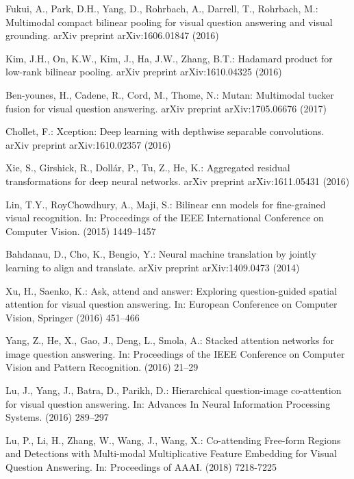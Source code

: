 \documentclass[runningheads]{llncs}
\begin{document}
\begin{thebibliography}{8}
Fukui, A., Park, D.H., Yang, D., Rohrbach, A., Darrell, T., Rohrbach, M.:
\newblock Multimodal compact bilinear pooling for visual question answering and
  visual grounding.
\newblock arXiv preprint arXiv:1606.01847 (2016)

Kim, J.H., On, K.W., Kim, J., Ha, J.W., Zhang, B.T.:
\newblock Hadamard product for low-rank bilinear pooling.
\newblock arXiv preprint arXiv:1610.04325 (2016)

Ben-younes, H., Cadene, R., Cord, M., Thome, N.:
\newblock Mutan: Multimodal tucker fusion for visual question answering.
\newblock arXiv preprint arXiv:1705.06676 (2017)

Chollet, F.:
\newblock Xception: Deep learning with depthwise separable convolutions.
\newblock arXiv preprint arXiv:1610.02357 (2016)

Xie, S., Girshick, R., Doll{\'a}r, P., Tu, Z., He, K.:
\newblock Aggregated residual transformations for deep neural networks.
\newblock arXiv preprint arXiv:1611.05431 (2016)

Lin, T.Y., RoyChowdhury, A., Maji, S.:
\newblock Bilinear cnn models for fine-grained visual recognition.
\newblock In: Proceedings of the IEEE International Conference on Computer
  Vision. (2015)  1449--1457

Bahdanau, D., Cho, K., Bengio, Y.:
\newblock Neural machine translation by jointly learning to align and
  translate.
\newblock arXiv preprint arXiv:1409.0473 (2014)

Xu, H., Saenko, K.:
\newblock Ask, attend and answer: Exploring question-guided spatial attention
  for visual question answering.
\newblock In: European Conference on Computer Vision, Springer (2016)  451--466

Yang, Z., He, X., Gao, J., Deng, L., Smola, A.:
\newblock Stacked attention networks for image question answering.
\newblock In: Proceedings of the IEEE Conference on Computer Vision and Pattern
  Recognition. (2016)  21--29

Lu, J., Yang, J., Batra, D., Parikh, D.:
\newblock Hierarchical question-image co-attention for visual question
  answering.
\newblock In: Advances In Neural Information Processing Systems. (2016)
  289--297

Lu, P., Li, H., Zhang, W., Wang, J., Wang, X.:
\newblock Co-attending Free-form Regions and Detections with Multi-modal Multiplicative Feature Embedding for Visual Question Answering.
\newblock In: Proceedings of AAAI. (2018)  7218-7225


\end{thebibliography}
\end{document}
